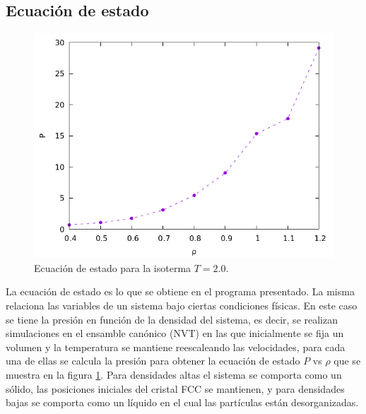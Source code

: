 \documentclass[a4paper,spanish,12pt,twoside]{article}
\begin{document}
\subsection{Ecuación de estado}

\begin{figure}[h]
	\centering
	\includegraphics[width=.7\textwidth]{eos.png}
	\caption{Ecuación de estado para la isoterma $T=2.0$.}
	\label{fig:eos}
\end{figure}
La ecuación de estado es lo que se obtiene en el programa presentado. La misma relaciona las variables de un sistema bajo ciertas condiciones físicas. En este caso se tiene la presión en función de la densidad del sistema, es decir, se realizan simulaciones en el ensamble canónico (NVT) en las que inicialmente se fija un volumen y la temperatura se mantiene reescaleando las velocidades, para cada una de ellas se calcula la presión para obtener la ecuación de estado $P$ vs $\rho$ que se muestra en la figura \ref{fig:eos}. Para densidades altas el sistema se comporta como un sólido, las posiciones iniciales del cristal FCC se mantienen, y para densidades bajas se comporta como un líquido en el cual las partículas están desorganizadas.
\end{document}
